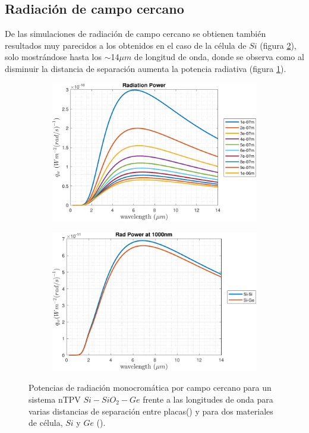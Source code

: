 \subsection{Radiación de campo cercano}
De las simulaciones de radiación de campo cercano se obtienen también resultados muy parecidos a los obtenidos en el caso de la célula de $Si$ (figura \ref{fig:SiSi_vs_SiGe}), solo mostrándose hasta los $\sim$14$\mu m$ de longitud de onda, donde se observa como al disminuir la distancia de separación aumenta la potencia radiativa (figura \ref{fig:rad_SiGe}).
\begin{figure}[H]
\centering
\begin{subfigure}[b]{0.49\textwidth}
	\centering
		\includegraphics[width=1.00\textwidth]{figuras/Resultados/radiacion/SiGe.pdf}
	\caption{ }
	\label{fig:rad_SiGe}
\end{subfigure}
\hfill
\begin{subfigure}[b]{0.49\textwidth}
	\centering
		\includegraphics[width=1.00\textwidth]{figuras/Resultados/radiacion/SiSi_vs_SiGe.pdf}
	\caption{ }
	\label{fig:SiSi_vs_SiGe}
\end{subfigure}
\caption{Potencias de radiación monocromática por campo cercano para un sistema nTPV $Si-SiO_2-Ge$ frente a las longitudes de onda para varias distancias de separación entre placas() y para dos materiales de célula, $Si$ y $Ge$ ().}
\label{fig:rads_SiGe}
\end{figure}
